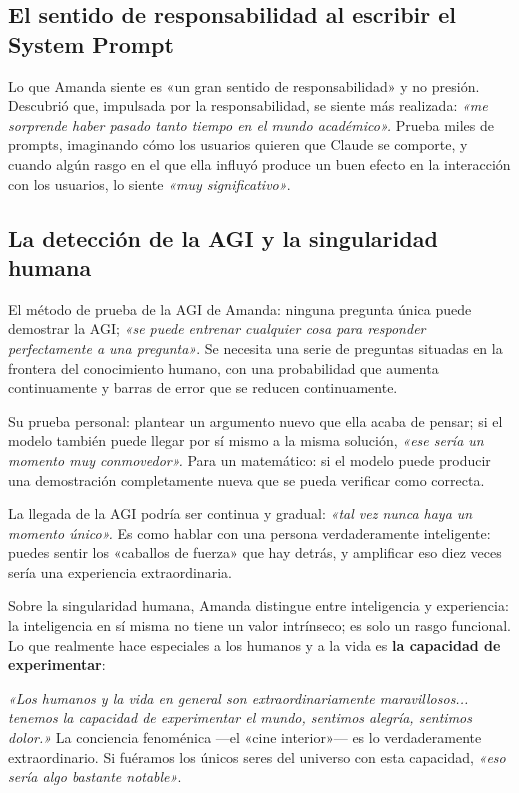 \documentclass[a4paper]{article}
\begin{document}
\subsection{El sentido de responsabilidad al escribir el System Prompt}

Lo que Amanda siente es «un gran sentido de responsabilidad» y no presión. Descubrió que, impulsada por la responsabilidad, se siente más realizada: \textit{«me sorprende haber pasado tanto tiempo en el mundo académico».} Prueba miles de prompts, imaginando cómo los usuarios quieren que Claude se comporte, y cuando algún rasgo en el que ella influyó produce un buen efecto en la interacción con los usuarios, lo siente \textit{«muy significativo»}.

\subsection{La detección de la AGI y la singularidad humana}

El método de prueba de la AGI de Amanda: ninguna pregunta única puede demostrar la AGI; \textit{«se puede entrenar cualquier cosa para responder perfectamente a una pregunta»}. Se necesita una serie de preguntas situadas en la frontera del conocimiento humano, con una probabilidad que aumenta continuamente y barras de error que se reducen continuamente.

Su prueba personal: plantear un argumento nuevo que ella acaba de pensar; si el modelo también puede llegar por sí mismo a la misma solución, \textit{«ese sería un momento muy conmovedor».} Para un matemático: si el modelo puede producir una demostración completamente nueva que se pueda verificar como correcta.

La llegada de la AGI podría ser continua y gradual: \textit{«tal vez nunca haya un momento único».} Es como hablar con una persona verdaderamente inteligente: puedes sentir los «caballos de fuerza» que hay detrás, y amplificar eso diez veces sería una experiencia extraordinaria.

Sobre la singularidad humana, Amanda distingue entre inteligencia y experiencia: la inteligencia en sí misma no tiene un valor intrínseco; es solo un rasgo funcional. Lo que realmente hace especiales a los humanos y a la vida es \textbf{la capacidad de experimentar}:

\textit{«Los humanos y la vida en general son extraordinariamente maravillosos... tenemos la capacidad de experimentar el mundo, sentimos alegría, sentimos dolor.»} La conciencia fenoménica —el «cine interior»— es lo verdaderamente extraordinario. Si fuéramos los únicos seres del universo con esta capacidad, \textit{«eso sería algo bastante notable»}.
\end{document}
